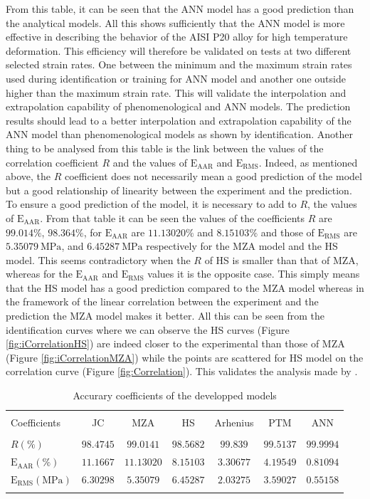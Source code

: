 \documentclass[twoside,english,1p,final,sort&compress]{elsarticle}
\theoremstyle{plain}
\newcommand{\RMSE}{\text{E}_\text{RMS}}
\newcommand{\AARE}{\text{E}_\text{AAR}}
\begin{document}
From this table, it can be seen that the ANN model has a good prediction than the analytical models. All this shows sufficiently that the ANN model is more effective in describing the behavior of the AISI P20 alloy for high temperature deformation. This efficiency will therefore be validated on tests at two different selected strain rates. One between the minimum and the maximum strain rates used during identification or training for ANN model and another one outside higher than the maximum strain rate. This will validate the interpolation and extrapolation capability of phenomenological and ANN models. The prediction results should lead to a better interpolation and extrapolation capability of the ANN model than phenomenological models as shown by identification. Another thing to be analysed from this table is the link between the values of the correlation coefficient $R$ and the values of $\AARE$ and $\RMSE$. Indeed, as mentioned above, the $R$ coefficient does not necessarily mean a good prediction of the model but a good relationship of linearity between the experiment and the prediction. To ensure a good prediction of the model, it is necessary to add to $R$, the values of $\AARE$. From that table it can be seen the values of the coefficients $R$ are $99.014\%$, $98.364\%$, for $\AARE$ are $11.13020\%$ and $8.15103\%$ and those of $\RMSE$ are $5.35079\ \text{MPa}$, and $6.45287\ \text{MPa}$ respectively for the MZA model and the HS model. This seems contradictory when the $R$ of HS is smaller than that of MZA, whereas for the $\AARE$ and $\RMSE$ values it is the opposite case. This simply means that the HS model has a good prediction compared to the MZA model whereas in the framework of the linear correlation between the experiment and the prediction the MZA model makes it better. All this can be seen from the identification curves where we can observe the HS curves (Figure \ref{fig:iCorrelationHS}) are indeed closer to the experimental than those of MZA (Figure \ref{fig:iCorrelationMZA}) while the points are scattered for HS model on the correlation curve (Figure \ref{fig:Correlation}). This validates the analysis made by \cite{Phaniraj-2003, Srinivasulu-2006}.

\begin{table}[h!]
\centering{}
\caption{Accurary coefficients of the developped models}
\begin{tabular}{lcccccc}
\hline
&		&		&         &             &		   &		  		\\
Coefficients&JC  & MZA  &HS  & Arhenius      & PTM  &ANN  		    \\
&				&				&         &             &		   &\\
\hline
$R(\%)$&$98.4745$&$99.0141$&$98.5682$&$99.839$& $99.5137$&$99.9994$ \\
$\AARE(\%)$&$11.1667$&$11.13020$&$8.15103$&$3.30677$&$4.19549$&$0.81094$   \\
$\RMSE(\text{MPa})$&$6.30298$&$5.35079$&$6.45287$&$2.03275$&$3.59027$&$0.55158$\\
\hline
\label{tab:Coefsparams}
\end{tabular}
\end{table}
\end{document}
